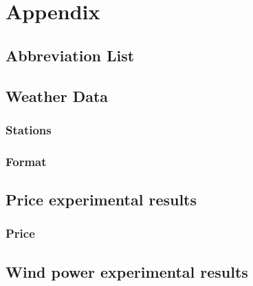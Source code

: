 \documentclass[twoside,11pt,openright]{report}
\begin{document}

 



\chapter{Appendix}
\label{ch:appendix}
\section{Abbreviation List}
\label{sec:abbreviationList}

\section{Weather Data}
\subsection{Stations}
\label{sec:weatherStations}

\subsection{Format} 
\label{sec:weatherDataFormat}
 
\section{Price experimental results}
\subsection{Price}
\label{sec:priceResultAppendix}
 
\section{Wind power experimental results}
\label{sec:windResultsAppendix}
 	
\end{document}
